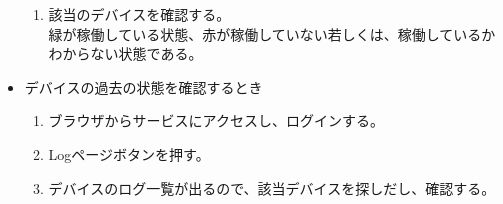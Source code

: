 \begin{itemize}
\begin{enumerate}
		\item 該当のデバイスを確認する。\\
			緑が稼働している状態、赤が稼働していない若しくは、稼働しているかわからない状態である。
	\end{enumerate}
\item デバイスの過去の状態を確認するとき
	\begin{enumerate}
		\item ブラウザからサービスにアクセスし、ログインする。
		\item Logページボタンを押す。
		\item デバイスのログ一覧が出るので、該当デバイスを探しだし、確認する。
	\end{enumerate}
\end{itemize}









